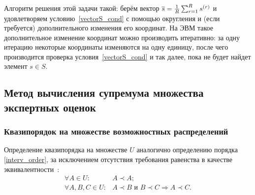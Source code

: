 	Алгоритм решения этой задачи такой: берём  вектор $ \overline{s} =  \frac{1}{R} \sum_{r=1}^R s^{(r)}$ и удовлетворяем условию~\eqref{vectorS_cond} с помощью округления и (если требуется) дополнительного изменения его координат. На ЭВМ такое дополнительное изменение координат можно производить итеративно: за одну итерацию некоторые координаты изменяются на одну единицу, после чего производится проверка условия~\eqref{vectorS_cond} и так далее, пока не будет найдет элемент $s \in S$.  %

\subsection{Метод вычисления супремума множества экспертных оценок}
\label{easy_collective_sup}

\subsubsection{Квазипорядок на множестве возможностных распределений}
\label{preorder_pyt}

Определение квазипорядка на множестве $U$ аналогично определению порядка \eqref{interv_order}, за исключением отсутствия требования равенства в качестве эквивалентности~\cite{Mirkin}:  
 \begin{equation}
\label{preoder_def}
\begin{split}
\forall A \in U: & A \prec A; \\
\forall A, B, C \in U: & A \prec B \text{ и } B \prec C \Rightarrow A \prec C.
\end{split}
\end{equation}

